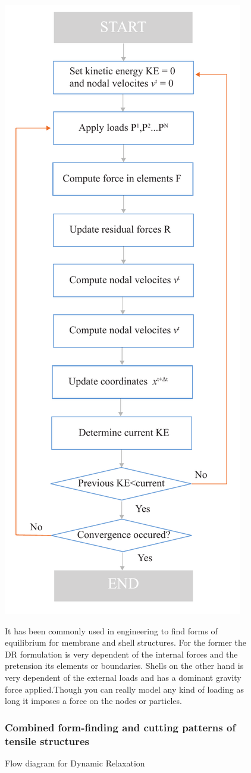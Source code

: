 \begin{figure}[H]
\centering
\includegraphics[height=1.2\linewidth ]{figure/Theory/DRScheme.pdf}
\caption{Flow diagram for Dynamic Relaxation }


It has been commonly used in engineering to find forms of equilibrium for membrane and shell structures. For the former the DR formulation is very dependent of the internal forces and the pretension its elements or boundaries. Shells on the other hand is very dependent of the external loads and has a dominant gravity force applied.Though you can really model any kind of loading as long it imposes a force on the nodes or particles.

\subsubsection{Combined form-finding and cutting patterns of tensile structures}

\end{figure}
